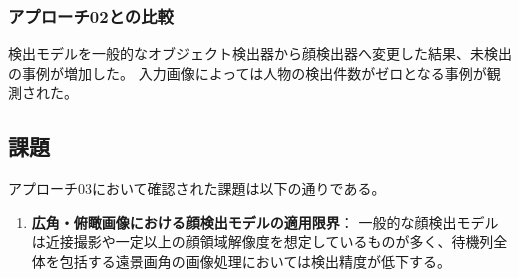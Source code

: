 \subsubsection{アプローチ02との比較}
検出モデルを一般的なオブジェクト検出器から顔検出器へ変更した結果、未検出の事例が増加した。
入力画像によっては人物の検出件数がゼロとなる事例が観測された。

\subsection{課題}
アプローチ03において確認された課題は以下の通りである。

\begin{enumerate}
    \item \textbf{広角・俯瞰画像における顔検出モデルの適用限界}：
    一般的な顔検出モデルは近接撮影や一定以上の顔領域解像度を想定しているものが多く、待機列全体を包括する遠景画角の画像処理においては検出精度が低下する。
\end{enumerate}

\clearpage
